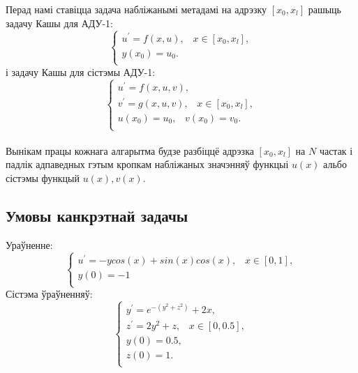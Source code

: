 Перад намі ставіцца задача набліжанымі метадамі на адрэзку $[x_0, x_l]$ рашыць задачу Кашы для АДУ-1:
\begin{equation}
    \begin{cases}
        u^{\prime} = f(x,u), \hspace{10pt} x \in [x_0, x_l],\\
        y(x_0) = u_0. \\
    \end{cases}
\end{equation}
і задачу Кашы для сістэмы АДУ-1:
\begin{equation}
    \begin{cases}
        u^{\prime} = f(x, u, v), \\
        v^{\prime} = g(x, u, v), \hspace{10pt} x \in [x_0, x_l],\\
        u(x_0) = u_0, \hspace{10pt} v(x_0) = v_0. \\
    \end{cases}
\end{equation} \\
Вынікам працы кожнага алгарытма будзе разбіццё адрэзка $[x_0, x_l]$ на $N$ частак і падлік адпаведных гэтым кропкам набліжаных значэнняў функцыі $u(x)$ альбо сістэмы функцый $u(x), v(x)$.

\subsection*{Умовы канкрэтнай задачы}
Ураўненне:\\
\begin{equation}
    \begin{cases}
        u^{\prime} = -y cos(x) + sin(x)cos(x), \hspace{10pt} x \in [0, 1],\\
        y(0) = -1 \\
    \end{cases}
\end{equation}
Сістэма ўраўненняў:
\begin{equation}
    \begin{cases}
        y^{\prime} = e ^{-(y^2+z^2)} + 2x, \\
        z^{\prime} = 2y^2 + z, \hspace{10pt} x \in [0, 0.5], \\
        y(0) = 0.5, \\
        z(0) = 1. \\
    \end{cases}
\end{equation}

